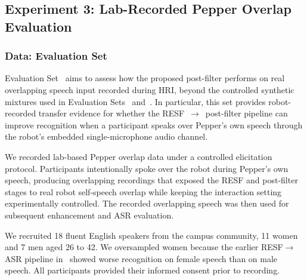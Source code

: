 \documentclass[manuscript,screen,review]{acmart}
\newcommand{\RomanNumeralCaps}[1]
    {\MakeUppercase{\romannumeral #1}}
\begin{document}
\subsection{Experiment 3: Lab-Recorded Pepper Overlap Evaluation}

\subsubsection{Data: Evaluation Set \RomanNumeralCaps{3}}
\label{subsec:eval3}

Evaluation Set~\RomanNumeralCaps{3} aims to assess how the proposed post-filter performs on real overlapping speech input recorded during HRI, beyond the controlled synthetic mixtures used in Evaluation Sets~\RomanNumeralCaps{1} and~\RomanNumeralCaps{2}. In particular, this set provides robot-recorded transfer evidence for whether the RESF~$\rightarrow$~post-filter pipeline can improve recognition when a participant speaks over Pepper's own speech through the robot's embedded single-microphone audio channel.

We recorded lab-based Pepper overlap data under a controlled elicitation protocol. Participants intentionally spoke over the robot during Pepper's own speech, producing overlapping recordings that exposed the RESF and post-filter stages to real robot self-speech overlap while keeping the interaction setting experimentally controlled. The recorded overlapping speech was then used for subsequent enhancement and ASR evaluation.


We recruited 18 fluent English speakers from the campus community, 11 women and 7 men aged 26 to 42. We oversampled women because the earlier RESF$\rightarrow$ASR pipeline in~\cite{li2024near} showed worse recognition on female speech than on male speech. All participants provided their informed consent prior to recording.
\end{document}

